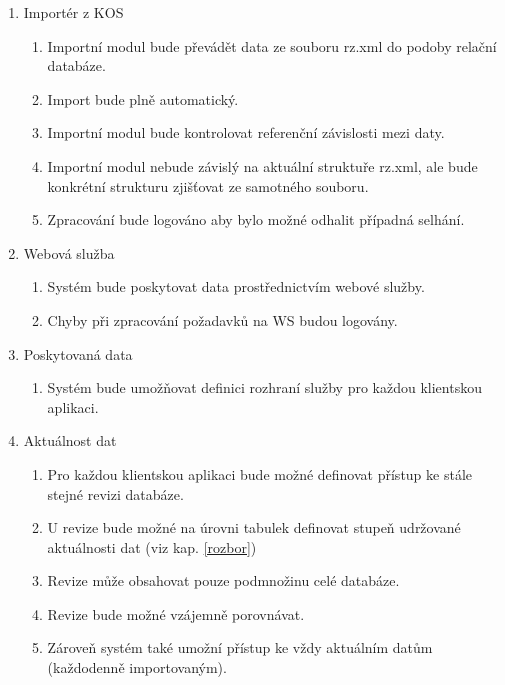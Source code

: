 \documentclass[11pt,twoside,a4paper]{book}
\begin{document}
\begin{enumerate}
\item Importér z KOS
\begin{enumerate}
\item Importní modul bude převádět data ze souboru rz.xml do podoby relační databáze.
\item Import bude plně automatický.
\item Importní modul bude kontrolovat referenční závislosti mezi daty.
\item Importní modul nebude závislý na aktuální struktuře rz.xml, ale bude konkrétní strukturu zjišťovat ze samotného souboru.
\item Zpracování bude logováno aby bylo možné odhalit případná selhání.
\end{enumerate}

\item Webová služba
\begin{enumerate}
\item Systém bude poskytovat data prostřednictvím webové služby.
\item Chyby při zpracování požadavků na WS budou logovány.
\end{enumerate}

\item Poskytovaná data
\begin{enumerate}
\item Systém bude umožňovat definici rozhraní služby pro každou klientskou aplikaci.
\end{enumerate}

\item Aktuálnost dat
\begin{enumerate}
\item Pro každou klientskou aplikaci bude možné definovat přístup ke stále stejné revizi databáze.
\item U revize bude možné na úrovni tabulek definovat stupeň udržované aktuálnosti dat (viz kap. \ref{rozbor})
\item Revize může obsahovat pouze podmnožinu celé databáze.
\item Revize bude možné vzájemně porovnávat.
\item Zároveň systém také umožní přístup ke vždy aktuálním datům (každodenně importovaným).
\end{enumerate}
\end{enumerate}
\end{document}
